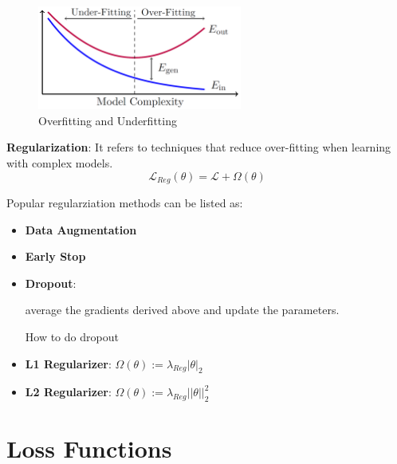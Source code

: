 \documentclass[a4paper]{article}
\begin{document}
\begin{figure}[h]
	\centering
	\includegraphics[width=0.6\textwidth]{images/overfitting.png}
	\caption{Overfitting and Underfitting}
	\label{fig:mesh1}
\end{figure}

\textbf{Regularization}: It refers to techniques that reduce over-fitting when learning with complex models.
\begin{equation}
	\mathcal{L}_{Reg} (\theta) = \mathcal{L} + \Omega(\theta)
\end{equation}

Popular regularziation methods can be listed as:
\begin{itemize}
	\item \textbf{Data Augmentation}
	\item \textbf{Early Stop}
	\item \textbf{Dropout}: 
	\begin{algorithm}[h]
		\SetAlgoLined
		average the gradients derived above and update the parameters.
		\caption{How to do dropout}
	\end{algorithm}
	\item \textbf{L1 Regularizer}: $\Omega(\theta) := \lambda_{Reg} | \theta | _2$
	\item \textbf{L2 Regularizer}: $\Omega(\theta) := \lambda_{Reg} || \theta || _2^2$
\end{itemize}

\section{Loss Functions}
\end{document}
